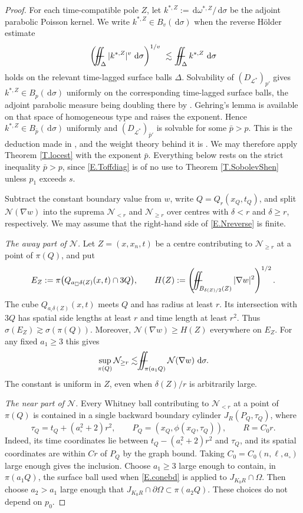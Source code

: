 \documentclass[12pt,leqno]{amsart}
\numberwithin{equation}{section}
\newcommand{\om}{\Omega}
\newcommand{\pom}{\partial\Omega}
\newcommand{\LL}{\mathcal L}
\renewcommand{\d}{\,\mathrm d}
\def\Yint#1{\mathchoice
	{\YYint\displaystyle\textstyle{#1}}%
	{\YYint\textstyle\scriptstyle{#1}}%
	{\YYint\scriptstyle\scriptscriptstyle{#1}}%
	{\YYint\scriptscriptstyle\scriptscriptstyle{#1}}%
	\!\dint}
\newcommand{\dint}{\int\!\!\!\!\!\int}
\def\YYint#1#2#3{{\setbox0=\hbox{$#1{#2#3}{\iint}$}
		\vcenter{\hbox{$#2#3$}}\kern-.51\wd0}}
\def\longdash{\mkern-1.5mu{-}\mkern-7.5mu{-}}
\def\fiint{\Yint\longdash}
\theoremstyle{plain}
\theoremstyle{remark}
\begin{document}
\begin{proof}
For each time-compatible pole $Z$, let
$k^{*,Z}:=\d\omega^{*,Z}/\d\sigma$ be the adjoint parabolic Poisson kernel.
We write $k^{*,Z}\in B_v(\d\sigma)$ when the reverse H\"older estimate
\[
 \left(\fiint_\Delta |k^{*,Z}|^v\,\d\sigma\right)^{1/v}
 \ \lesssim\ \fiint_\Delta k^{*,Z}\,\d\sigma
\]
holds on the relevant time-lagged surface balls $\Delta$.
Solvability of $(D_{\LL^*})_{p'}$ gives
$k^{*,Z}\in B_p(\d\sigma)$ uniformly on the corresponding time-lagged
surface balls, the adjoint parabolic measure being doubling there by
\cite[Theorem 3.2]{N}. Gehring's lemma is available on that space of
homogeneous type and raises the exponent. Hence
$k^{*,Z}\in B_{\bar p}(\d\sigma)$ uniformly and
$(D_{\LL^*})_{\bar p'}$ is solvable
for some $\bar p>p$. This is the deduction made in \cite[\S5]{DN}, and the
weight theory behind it is \cite[Theorem 6.1]{N}. We may therefore apply
Theorem \ref{T.locest} with the exponent $\bar p$. Everything below rests on
the strict inequality $\bar p>p$, since \eqref{E.Toffdiag} is of no use to
Theorem \ref{T.SobolevShen} unless $p_1$ exceeds $s$.

Subtract the constant boundary value from $w$, write $Q=Q_r(x_Q,t_Q)$,
and split $\mathcal N(\nabla w)$ into the suprema $\mathcal N_{<r}$ and
$\mathcal N_{\ge r}$ over centres with $\delta<r$ and $\delta\ge r$,
respectively. We may assume that the right-hand side of \eqref{E.Nreverse}
is finite.\medskip

\noindent\emph{The away part of $\mathcal N$.} Let $Z=(x,x_n,t)$ be a centre contributing
to $\mathcal N_{\ge r}$ at a point of $\pi(Q)$, and put
\[
 E_Z:=\pi\big(Q_{a_\square\delta(Z)}(x,t)\cap3Q\big),\qquad
 H(Z):=\left(\fiint_{B_{\delta(Z)/2}(Z)}|\nabla w|^2\right)^{1/2}.
\]
The cube $Q_{a_\square\delta(Z)}(x,t)$ meets $Q$ and has radius at least $r$.
Its intersection with $3Q$ has spatial side lengths at least $r$ and time
length at least $r^2$. Thus $\sigma(E_Z)\gtrsim\sigma(\pi(Q))$.
Moreover, $\mathcal N(\nabla w)\ge H(Z)$ everywhere on $E_Z$.
For any fixed $a_1\ge3$ this gives
\[
 \sup_{\pi(Q)}\mathcal N_{\ge r}
 \lesssim\fiint_{\pi(a_1Q)}\mathcal N(\nabla w)\,\d\sigma.
\]
The constant is uniform in $Z$, even when $\delta(Z)/r$ is arbitrarily
large.\medskip

\noindent\emph{The near part of $\mathcal N$.} Every Whitney ball contributing to
$\mathcal N_{<r}$ at a point of $\pi(Q)$ is contained in a single backward
boundary cylinder $J_R(P_Q,\tau_Q)$, where
\[
 \tau_Q=t_Q+(a_\square^2+2)r^2,\qquad
 P_Q=(x_Q,\phi(x_Q,\tau_Q)),\qquad R=C_0r.
\]
Indeed, its time coordinates lie between
$t_Q-(a_\square^2+2)r^2$ and $\tau_Q$, and its spatial coordinates are within
$Cr$ of $P_Q$ by the graph bound. Taking $C_0=C_0(n,\ell,a_\square)$ large enough
gives the inclusion. Choose $a_1\ge3$ large enough to contain, in
$\pi(a_1Q)$, the surface ball used when \eqref{E.conebd} is applied to
$J_{K_0R}\cap\om$. Then choose $a_2>a_1$ large enough that
$J_{K_0R}\cap\pom\subset\pi(a_2Q)$. These choices do not depend on $p_0$.


\end{proof}
\end{document}
